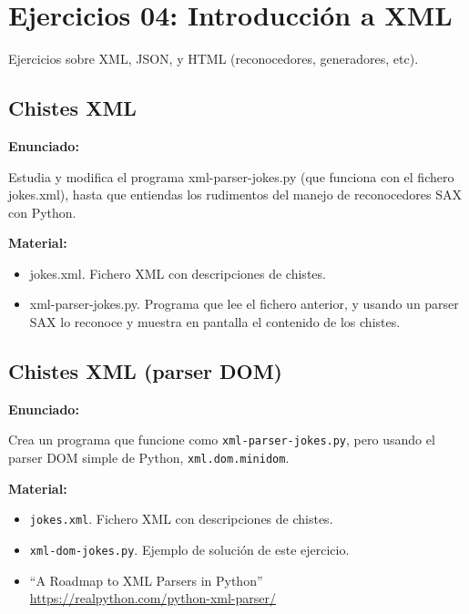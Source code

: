 \section{Ejercicios 04: Introducción a XML}

Ejercicios sobre XML, JSON, y HTML (reconocedores, generadores, etc).

\subsection{Chistes XML}
\label{subsec:xml-chistes}

\textbf{Enunciado:}

Estudia y modifica el programa xml-parser-jokes.py (que funciona con el fichero jokes.xml), hasta que entiendas los rudimentos del manejo de reconocedores SAX con Python.

\textbf{Material:}

\begin{itemize}
  \item jokes.xml. Fichero XML con descripciones de chistes.
  \item xml-parser-jokes.py. Programa que lee el fichero anterior, y usando un parser SAX lo reconoce y muestra en pantalla el contenido de los chistes.
\end{itemize}

\subsection{Chistes XML (parser DOM)}
\label{subsec:xml-chistes-dom}

\textbf{Enunciado:}

Crea un programa que funcione como \texttt{xml-parser-jokes.py}, pero usando el parser DOM simple de Python, \texttt{xml.dom.minidom}.

\textbf{Material:}

\begin{itemize}
  \item \texttt{jokes.xml}. Fichero XML con descripciones de chistes.
  \item \texttt{xml-dom-jokes.py}. Ejemplo de solución de este ejercicio.
  \item ``A Roadmap to XML Parsers in Python'' \\
    \url{https://realpython.com/python-xml-parser/}
\end{itemize}

